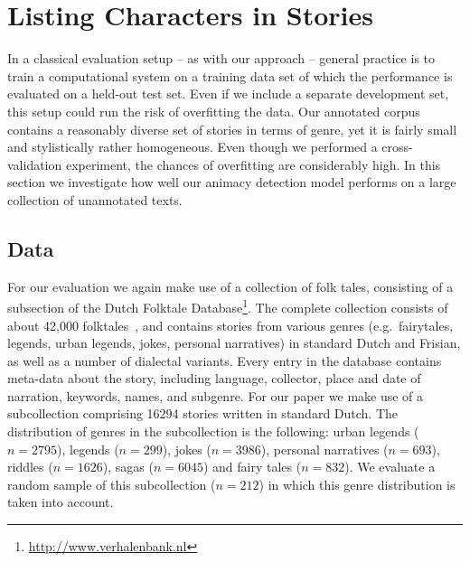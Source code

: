 \documentclass[a4paper,UKenglish]{oasics}
\begin{document}
\section{Listing Characters in Stories}\label{sec:listing}

In a classical evaluation setup -- as with our approach -- general
practice is to train a computational system on a training data set of
which the performance is evaluated on a held-out test set. Even if we
include a separate development set, this setup could run the risk
of overfitting the data. Our annotated corpus contains a reasonably
diverse set of stories in terms of genre, yet it is fairly small and
stylistically rather homogeneous. Even though we performed a
cross-validation experiment, the chances of overfitting are
considerably high. In this section we investigate how well our animacy
detection model performs on a large collection of unannotated texts.
\subsection{Data}
For our evaluation we again make use of a collection of folk tales, consisting of a subsection of the Dutch Folktale Database\footnote{\url{http://www.verhalenbank.nl}}. The complete collection consists of about 42,000 folktales~\cite{meder:10}, and contains stories from various genres (e.g.~fairytales, legends, urban legends, jokes, personal narratives) in standard Dutch and Frisian, as well as a number of dialectal variants. Every entry in the database contains
meta-data about the story, including language, collector, place and
date of narration, keywords, names, and subgenre. For our paper we make use of a
subcollection comprising 16294 stories written in standard Dutch. The distribution of genres in the subcollection is the following: urban legends ($n=2795$), legends
($n=299$), jokes ($n=3986$), personal narratives ($n=693$), riddles
($n=1626$), sagas ($n=6045$) and fairy tales ($n=832$). We evaluate a
random sample of this subcollection ($n=212$) in which this genre
distribution is taken into account.
\end{document}
